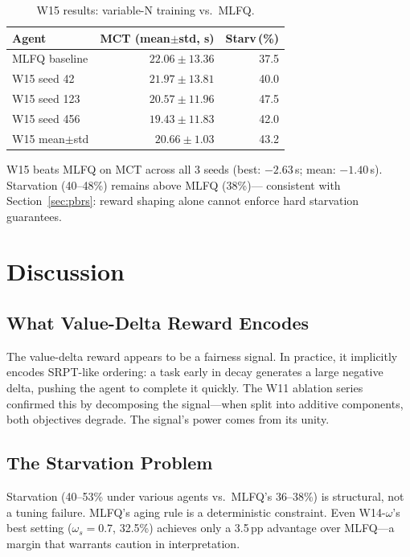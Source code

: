 \documentclass[10pt,twocolumn]{article}
\theoremstyle{remark}
\begin{document}
\begin{table}[h]
\centering
\caption{W15 results: variable-N training vs.\ MLFQ.}
\label{tab:w15}
\small
\begin{tabular}{lrr}
\toprule
Agent & MCT (mean$\pm$std, s) & Starv\,(\%) \\
\midrule
MLFQ baseline & $22.06\pm13.36$ & 37.5 \\
W15 seed 42 & $21.97\pm13.81$ & 40.0 \\
W15 seed 123 & $20.57\pm11.96$ & 47.5 \\
W15 seed 456 & $\mathbf{19.43\pm11.83}$ & 42.0 \\
W15 mean$\pm$std & $20.66\pm1.03$ & 43.2 \\
\bottomrule
\end{tabular}
\end{table}

W15 beats MLFQ on MCT across all 3 seeds (best: $-2.63$\,s; mean:
$-1.40$\,s). Starvation (40--48\%) remains above MLFQ (38\%)---
consistent with Section~\ref{sec:pbrs}: reward shaping alone cannot
enforce hard starvation guarantees.

\section{Discussion}

\subsection{What Value-Delta Reward Encodes}

The value-delta reward appears to be a fairness signal. In practice,
it implicitly encodes SRPT-like ordering: a task early in decay
generates a large negative delta, pushing the agent to complete it
quickly. The W11 ablation series confirmed this by decomposing the
signal---when split into additive components, both objectives degrade.
The signal's power comes from its unity.

\subsection{The Starvation Problem}

Starvation (40--53\% under various agents vs.\ MLFQ's 36--38\%) is
structural, not a tuning failure. MLFQ's aging rule is a deterministic
constraint. Even W14-$\omega$'s best setting ($\omega_s=0.7$, 32.5\%)
achieves only a 3.5\,pp advantage over MLFQ---a margin that warrants
caution in interpretation.
\end{document}
